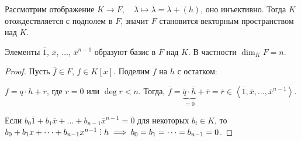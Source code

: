 \bigskip
Рассмотрим отображение $K \to F, \quad \lambda \mapsto \overline{\lambda} = \lambda + (h)$, оно инъективно. Тогда $K$ отождествляется с подполем в $F$, значит $F$ становится векторным пространством над $K$.

\begin{proposal}
    Элементы $\overline{1}$, $\overline{x}$, $\dots$, $\overline{x}^{n - 1}$ образуют базис в $F$ над $K$. В частности $\dim_K F = n$.
\end{proposal}

\begin{proof}
    Пусть $\overline{f} \in F$, $f \in K[x]$. Поделим $f$ на $h$ с остатком:

    $f = q \cdot h + r$, где $r = 0$ или $\deg r < n$. Тогда, $\overline{f} = \underbrace{\overline{q} \cdot \overline{h}}_{= \overline{0}} + \overline{r} = \overline{r} \in \left< \overline{1}, \overline{x}, \dots, \overline{x}^{n - 1} \right>$.

    Если $b_0 \overline{1} + b_1 \overline{x} + \dots + b_{n - 1} \overline{x}^{n - 1} = \overline{0}$ для некоторых $b_i \in K$, то $b_0 + b_1 x + \dots + b_{n - 1} x^{n - 1} \divby h \implies b_0 = b_1 = \dots = b_{n - 1} = 0$.
\end{proof}
